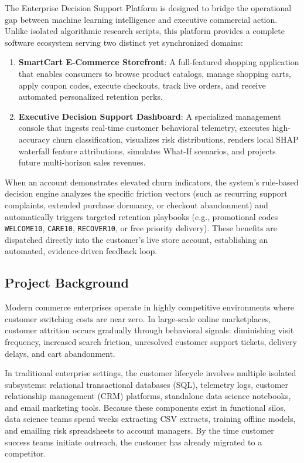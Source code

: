 \documentclass[12pt,a4paper]{article}
\begin{document}
The Enterprise Decision Support Platform is designed to bridge the operational gap between machine learning intelligence and executive commercial action. Unlike isolated algorithmic research scripts, this platform provides a complete software ecosystem serving two distinct yet synchronized domains:
\begin{enumerate}[leftmargin=20pt]
    \item \textbf{SmartCart E-Commerce Storefront}: A full-featured shopping application that enables consumers to browse product catalogs, manage shopping carts, apply coupon codes, execute checkouts, track live orders, and receive automated personalized retention perks.
    \item \textbf{Executive Decision Support Dashboard}: A specialized management console that ingests real-time customer behavioral telemetry, executes high-accuracy churn classification, visualizes risk distributions, renders local SHAP waterfall feature attributions, simulates What-If scenarios, and projects future multi-horizon sales revenues.
\end{enumerate}

When an account demonstrates elevated churn indicators, the system's rule-based decision engine analyzes the specific friction vectors (such as recurring support complaints, extended purchase dormancy, or checkout abandonment) and automatically triggers targeted retention playbooks (e.g., promotional codes \texttt{WELCOME10}, \texttt{CARE10}, \texttt{RECOVER10}, or free priority delivery). These benefits are dispatched directly into the customer's live store account, establishing an automated, evidence-driven feedback loop.

\subsection{Project Background}\label{sub:1.2}

Modern commerce enterprises operate in highly competitive environments where customer switching costs are near zero. In large-scale online marketplaces, customer attrition occurs gradually through behavioral signals: diminishing visit frequency, increased search friction, unresolved customer support tickets, delivery delays, and cart abandonment. 

In traditional enterprise settings, the customer lifecycle involves multiple isolated subsystems: relational transactional databases (SQL), telemetry logs, customer relationship management (CRM) platforms, standalone data science notebooks, and email marketing tools. Because these components exist in functional silos, data science teams spend weeks extracting CSV extracts, training offline models, and emailing risk spreadsheets to account managers. By the time customer success teams initiate outreach, the customer has already migrated to a competitor.
\end{document}
